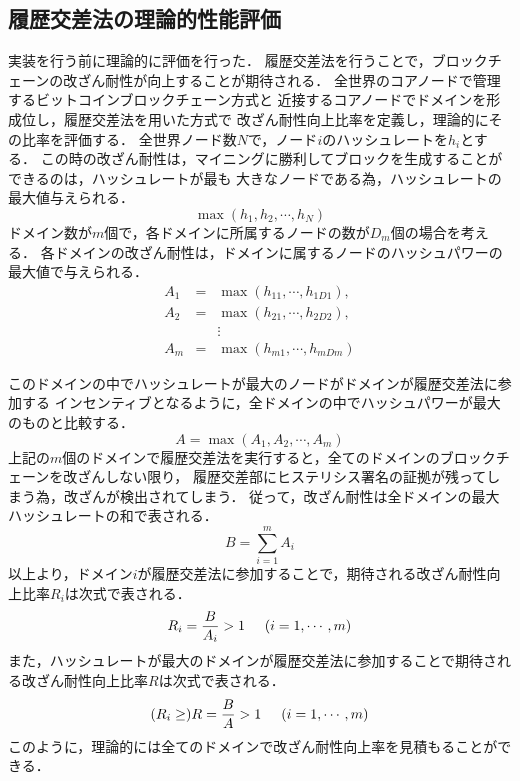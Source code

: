 \documentclass[a4paper,12pt]{jsarticle}
\begin{document}
\subsection{履歴交差法の理論的性能評価}
実装を行う前に理論的に評価を行った．
履歴交差法を行うことで，ブロックチェーンの改ざん耐性が向上することが期待される．
全世界のコアノードで管理するビットコインブロックチェーン方式と
近接するコアノードでドメインを形成位し，履歴交差法を用いた方式で
改ざん耐性向上比率を定義し，理論的にその比率を評価する．
全世界ノード数$N$で，ノード$i$のハッシュレートを$h_i$とする．
この時の改ざん耐性は，マイニングに勝利してブロックを生成することができるのは，ハッシュレートが最も
大きなノードである為，ハッシュレートの最大値与えられる．
%
\begin{equation}
  \max(h_1, h_2, \cdots, h_N)
\end{equation}
%
ドメイン数が$m$個で，各ドメインに所属するノードの数が$D_m$個の場合を考える．
各ドメインの改ざん耐性は，ドメインに属するノードのハッシュパワーの最大値で与えられる．
%
\begin{eqnarray}
	A_1 &=& \max (h_{11}, \cdots ,h_{1D1}), \\
	A_2 &=& \max(h_{21}, \cdots ,h_{2D2}), \\
	    & & \vdots \nonumber \\
	A_m &=& \max(h_{m1}, \cdots ,h_{mDm})
\end{eqnarray}
%

このドメインの中でハッシュレートが最大のノードがドメインが履歴交差法に参加する
インセンティブとなるように，全ドメインの中でハッシュパワーが最大のものと比較する．
%
\begin{equation}
A = \max(A_1, A_2, \cdots, A_m)
\end{equation}
%
上記の$m$個のドメインで履歴交差法を実行すると，全てのドメインのブロックチェーンを改ざんしない限り，
履歴交差部にヒステリシス署名の証拠が残ってしまう為，改ざんが検出されてしまう．
従って，改ざん耐性は全ドメインの最大ハッシュレートの和で表される．
%
\begin{equation}
	B = \sum_{i=1}^{m} A_i
\end{equation}
%
以上より，ドメイン$i$が履歴交差法に参加することで，期待される改ざん耐性向上比率$R_i$は次式で表される．
%
\begin{equation}
	R_i = \frac{B}{A_i} > 1 \hspace{5mm} (i=1, \cdots, m)
\end{equation}
%
また，ハッシュレートが最大のドメインが履歴交差法に参加することで期待される改ざん耐性向上比率$R$は次式で表される．
%
\begin{equation}
	(R_i \ge) R = \frac{B}{A} > 1  \hspace{5mm} (i=1, \cdots, m)
\end{equation}
%
このように，理論的には全てのドメインで改ざん耐性向上率を見積もることができる．
\end{document}
